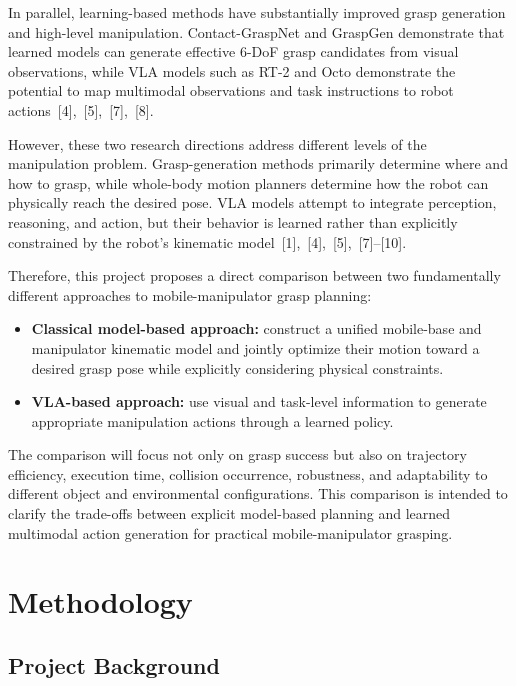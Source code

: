 \documentclass[12pt,a4paper]{article}
\begin{document}
In parallel, learning-based methods have substantially improved grasp generation and
high-level manipulation. Contact-GraspNet and GraspGen demonstrate that learned models can
generate effective 6-DoF grasp candidates from visual observations, while VLA models such as
RT-2 and Octo demonstrate the potential to map multimodal observations and task instructions
to robot actions~[4],~[5],~[7],~[8].

However, these two research directions address different levels of the manipulation
problem. Grasp-generation methods primarily determine where and how to grasp, while
whole-body motion planners determine how the robot can physically reach the desired pose.
VLA models attempt to integrate perception, reasoning, and action, but their behavior is
learned rather than explicitly constrained by the robot's kinematic model~[1],~[4],~[5],~[7]--[10].

Therefore, this project proposes a direct comparison between two fundamentally
different approaches to mobile-manipulator grasp planning:

\begin{itemize}
  \item \textbf{Classical model-based approach:} construct a unified mobile-base and manipulator
        kinematic model and jointly optimize their motion toward a desired grasp pose while
        explicitly considering physical constraints.
  \item \textbf{VLA-based approach:} use visual and task-level information to generate appropriate
        manipulation actions through a learned policy.
\end{itemize}

The comparison will focus not only on grasp success but also on trajectory efficiency, execution
time, collision occurrence, robustness, and adaptability to different object and environmental
configurations. This comparison is intended to clarify the trade-offs between explicit
model-based planning and learned multimodal action generation for practical
mobile-manipulator grasping.

\newpage
\section*{Methodology}

\subsection*{Project Background}
\end{document}
